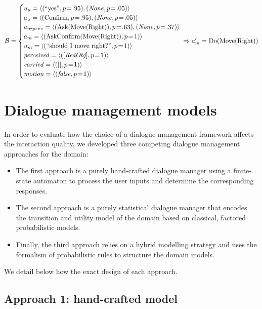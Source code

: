 \begin{align*}
\mathcal{B} = \begin{cases} u_u = \langle (``\text{yes}", p\!=\!.95), (\mathit{None}, p\!=\!.05) \rangle \\
a_u = \langle (\mathrm{Confirm}, p\!=\!.95), (\mathit{None}, p\!=\!.05) \rangle \\
a_{u\mbox{-}prev} = \langle (\mathrm{Ask(Move(Right))}, p\!=\!.63), (\mathit{None}, p\!=\!.37) \rangle \\
a_m = \langle (\mathrm{AskConfirm(Move(Right))}, p\!=\!1) \rangle \\
u_m = \langle (``\text{should I move right?}", p\!=\!1) \rangle \\
\mathit{perceived} = \langle ([\mathit{RedObj}], p\!=\!1) \rangle \\
\mathit{carried} = \langle ([], p\!=\!1) \rangle \\
\mathit{motion} = \langle (\mathit{false}, p\!=\!1) \rangle \\
 \end{cases} \!\!\!\!\!\Rightarrow a_m' = \mathrm{Do(Move(Right))}
\end{align*}


\section{Dialogue management models}
\label{sec:dialmodels_exp3}

In order to evaluate how the choice of a dialogue management framework affects the interaction quality, we developed three competing dialogue management approaches for the domain:
\begin{itemize} 
\item The first approach is a purely hand-crafted dialogue manager using a finite-state automaton to process the user inputs and determine the corresponding responses. 
\item The second approach is a purely statistical dialogue manager that encodes the transition and utility model of the domain based on classical, factored probabilistic models.
\item Finally, the third approach relies on a hybrid modelling strategy and uses the formalism of probabilistic rules to structure the domain models.
\end{itemize}

We detail below how the exact design of each approach.

\subsection{Approach 1: hand-crafted model}
\label{sec:approach1}

